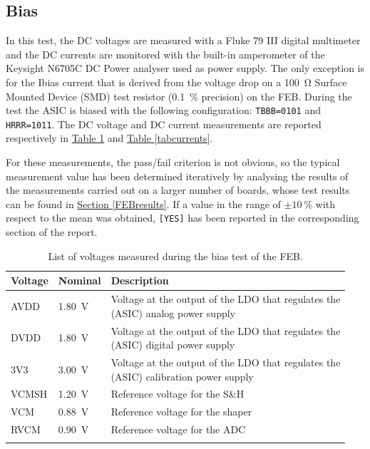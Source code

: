 \subsection{Bias} \label{bias}

In this test, the DC voltages are measured with a Fluke 79 III digital multimeter and the DC currents are monitored with the built-in amperometer of the Keysight N6705C
DC Power analyser used as power supply. The only exception is for the Ibias current that is derived from the voltage drop on a \SI{100}{\ohm} Surface Mounted Device (SMD) test resistor (\SI{0.1}{\percent} precision) on the FEB. During the test the ASIC is biased with the following configuration: \texttt{TBBB=0101} and \texttt{HRRR=1011}. The DC voltage and DC current measurements are reported respectively in \hyperref[tabvoltages]{Table \ref{tabvoltages}} and \hyperref[tabcurrents]{Table \ref{tabcurrents}}.

\par
For these measurements, the pass/fail criterion is not obvious, so the typical measurement value has been determined iteratively by analysing the results of the measurements carried out on a larger number of boards, whose test results can be found in \hyperref[FEBresults]{Section \ref{FEBresults}}. If a value in the range of $\pm \SI{10}{\percent}$ with respect to the mean was obtained, \texttt{[YES]}
has been reported in the corresponding section of the report.

\begin{table}[ht]
    \centering
    \begin{tabular}{l l l} 
         \Xhline{2\arrayrulewidth}
         Voltage & Nominal & Description \T\B \\
         \hline
         AVDD & \SI{1.80}{\volt} & \makecell[l]{Voltage at the output of the LDO that regulates the  \T \\ (ASIC) analog power supply \B} \\ 
         DVDD & \SI{1.80}{\volt} & \makecell[l]{Voltage at the output of the LDO that regulates \T the \\ (ASIC) digital power supply \B} \\ 
         3V3 & \SI{3.00}{\volt} & \makecell[l]{Voltage at the output of the LDO that regulates \T the \\ (ASIC) calibration power supply \B} \\ 
         VCMSH & \SI{1.20}{\volt} & Reference voltage for the S\&H \T\B \\ 
         VCM & \SI{0.88}{\volt} & Reference voltage for the shaper \T\B \\ 
         RVCM & \SI{0.90}{\volt} & Reference voltage for the ADC \T\B \\ 
         \Xhline{2\arrayrulewidth}
    \end{tabular}
    \caption{List of voltages measured during the bias test of the FEB.}
    \label{tabvoltages}
\end{table}

